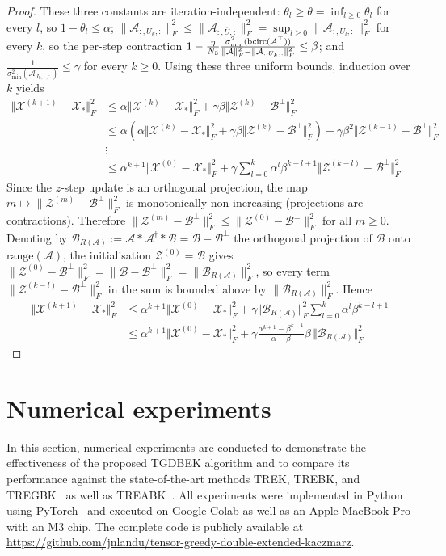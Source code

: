 \documentclass[11pt]{article}
\newcommand{\ran}{\mathrm{range}}
\def\fm#1{\mathcal{#1}}
\def \ai#1{\fm A_{#1, :, :}}
\def \x#1{\fm X^{(#1)}}
\begin{document}
\begin{proof}
These three constants are iteration-independent: $\theta_l \geq \theta = \inf_{l\geq 0}\theta_l$ for every $l$, so $1-\theta_l \leq \alpha$; $\|\fm A_{:,U_k,:}\|_F^2 \leq \|\fm A_{:,\overline{U},:}\|_F^2 = \sup_{l\geq 0}\|\fm A_{:,U_l,:}\|_F^2$ for every $k$, so the per-step contraction $1 - \frac{\eta}{N_3}\frac{\sigma_{\min}^2(\bcirc(\fm A^\top))}{\|\fm A\|_F^2 - \|\fm A_{:,U_k,:}\|_F^2} \leq \beta$;
and $\frac{1}{\sigma_{\min}^2(\ai{J_k})}\leq\gamma$ for every $k\geq 0$.
Using these three uniform bounds, induction over $k$ yields
\begin{align*}
    \Vert \x{k+1} - \fm X_\ast \Vert_F^2  & \leq \alpha  \Vert \x k - \fm X_\ast \Vert_F^2 + \gamma\beta \Vert \fm Z^{(k)} - \fm B^\perp \Vert_F^2\\
    & \leq \alpha \left( \alpha  \Vert \x k - \fm X_\ast \Vert_F^2 + \gamma\beta \Vert \fm Z^{(k)} - \fm B^\perp \Vert_F^2 \right) + \gamma\beta^2 \Vert \fm Z^{(k-1)} - \fm B^\perp \Vert_F^2\\
    &\vdots\\
    & \leq \alpha^{k+1} \Vert \x 0 - \fm X_\ast \Vert_F^2  + \gamma\sum_{l=0}^k \alpha^{l} \beta^{k-l+1}  \Vert \fm Z^{(k-l)} - \fm B^\perp \Vert_F^2.
\end{align*}
Since the $z$-step update is an orthogonal projection, the map
$m\mapsto\|\fm Z^{(m)}-\fm B^\perp\|_F^2$ is monotonically non-increasing
(projections are contractions).
Therefore $\|\fm Z^{(m)}-\fm B^\perp\|_F^2\leq\|\fm Z^{(0)}-\fm B^\perp\|_F^2$
for all $m\geq 0$.
Denoting by $\fm B_{R(\fm A)}:=\fm A*\fm A^\dagger*\fm B=\fm B-\fm B^\perp$ the orthogonal projection of $\fm B$ onto $\ran(\fm A)$, the initialisation $\fm Z^{(0)}=\fm B$ gives
$\|\fm Z^{(0)}-\fm B^\perp\|_F^2=\|\fm B-\fm B^\perp\|_F^2=\|\fm B_{R(\fm A)}\|_F^2$,
so every term $\|\fm Z^{(k-l)}-\fm B^\perp\|_F^2$ in the sum is bounded above by
$\|\fm B_{R(\fm A)}\|_F^2$.
Hence
\begin{align*}
    \Vert \x{k+1} - \fm X_\ast \Vert_F^2
    &\leq \alpha^{k+1} \Vert \x 0 - \fm X_\ast \Vert_F^2  + \gamma\Vert \fm B_{R(\fm A)}\Vert_F^2 \sum_{l=0}^k \alpha^{l} \beta^{k-l+1}\\
    &\leq \alpha^{k+1} \Vert \x 0 - \fm X_\ast \Vert_F^2 + \gamma\frac{\alpha^{k+1} -\beta^{k+1}}{\alpha - \beta} \beta\,\Vert \fm B_{R(\fm A)}\Vert_F^2
\end{align*}
\end{proof}


\section{Numerical experiments} \label{sec:numexp}
In this section, numerical experiments are conducted to demonstrate the effectiveness of the proposed TGDBEK algorithm and to compare its performance against the state-of-the-art methods TREK, TREBK, and TREGBK~\cite{huang2023TREK} as well as TREABK~\cite{su2025}. All experiments were implemented in Python using PyTorch~\cite{ansel2025pytorch} and executed on Google Colab as well as an Apple MacBook Pro with an M3 chip. The complete code is publicly available at \url{https://github.com/jnlandu/tensor-greedy-double-extended-kaczmarz}.
\end{document}
